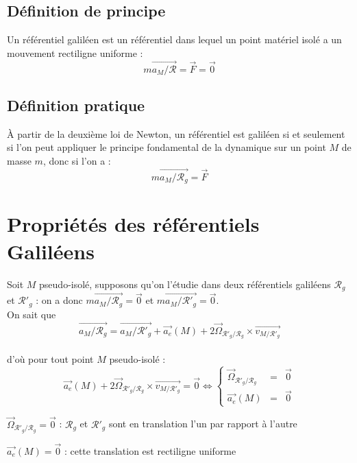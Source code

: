 \documentclass[a4paper,10pt]{book} %
\begin{document}
\subsection{Définition de principe}
Un référentiel galiléen est un référentiel dans lequel un point matériel isolé a un mouvement rectiligne uniforme :
$$m\overrightarrow{a_M/\mathcal{R}}=\overrightarrow{F}=\overrightarrow{0}$$

\subsection{Définition pratique}
\`{A} partir de la deuxième loi de Newton, un référentiel est galiléen si et seulement si l'on peut appliquer le principe fondamental de la dynamique sur un point $M$ de masse $m$, donc si l'on a :
$$m\overrightarrow{a_M/\mathcal{R}_g}=\overrightarrow{F}$$

\section{Propriétés des référentiels Galiléens}
Soit $M$ pseudo-isolé, supposons qu'on l'étudie dans deux référentiels galiléens $\mathcal{R}_g$ et $\mathcal{R}'_g$ : on a donc $m\overrightarrow{a_M/\mathcal{R}_g}=\overrightarrow{0}$ et $m\overrightarrow{a_M/\mathcal{R}'_g}=\overrightarrow{0}$.\\

On sait que 
$$\overrightarrow{a_M/\mathcal{R}_g}=\overrightarrow{a_M/\mathcal{R}'_g}+\overrightarrow{a_e}(M)+2\overrightarrow{\Omega}_{\mathcal{R}'_g/\mathcal{R}_g}\times \overrightarrow{v_{M/\mathcal{R}'_g}}$$\\
d'où pour tout point $M$ pseudo-isolé :\\ $$\overrightarrow{a_e}(M)+2\overrightarrow{\Omega}_{\mathcal{R}'_g/\mathcal{R}_g}\times \overrightarrow{v_{M/\mathcal{R}'_g}}=\overrightarrow{0}
\Leftrightarrow \left\{\begin{array}{rcl} \overrightarrow{\Omega}_{\mathcal{R}'_g/\mathcal{R}_g}&=&\overrightarrow{0} \\
\overrightarrow{a_e}(M)&=&\overrightarrow{0} \end{array}\right.$$

$\overrightarrow{\Omega}_{\mathcal{R}'_g/\mathcal{R}_g}=\overrightarrow{0}$ : $\mathcal{R}_g$ et $\mathcal{R}'_g$ sont en translation l'un par rapport à l'autre

$\overrightarrow{a_e}(M)=\overrightarrow{0}$ : cette translation est rectiligne uniforme
\end{document}

